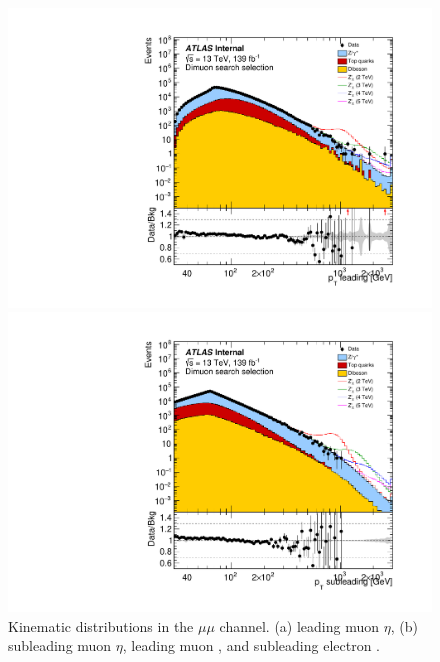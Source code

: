 {\begin{figure}[h!]
\begin{minipage}[b]{.45\linewidth}
    \includegraphics[width=1\textwidth]{figures/ci/dataMc/stacks_mc16e_2015-2018_uu_pt1_log100.pdf}
    \subcaption{}
\end{minipage}
\begin{minipage}[b]{.45\linewidth}
    \includegraphics[width=1\textwidth]{figures/ci/dataMc/stacks_mc16e_2015-2018_uu_pt2_log100.pdf}
    \subcaption{}
\end{minipage}
\caption{Kinematic distributions in the $\mu\mu$ channel. (a) leading muon $\eta$, (b) subleading muon $\eta$, leading muon \pt, and subleading electron \pt.}
\label{fig:}
\end{figure}
\clearpage
}

\clearpage

